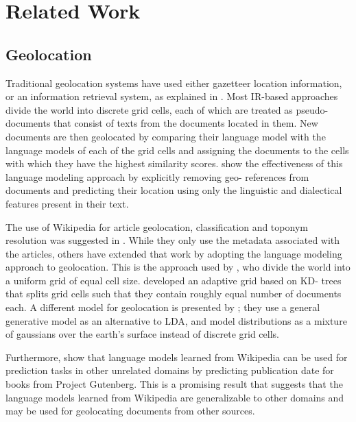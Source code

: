\section{Related Work} 

\subsection{Geolocation}   

Traditional geolocation systems have used either
gazetteer location information, or an information retrieval system, as
explained in \cite{skiles:12}. Most IR-based approaches divide the world into
discrete grid cells, each of which are treated as pseudo-documents that
consist of texts from the documents located in them. New documents are then
geolocated by comparing their language model with the language models of each
of the grid cells and assigning the documents to the cells with which they
have the highest similarity scores. \cite{eisenstein-smith-xing:11} show the
effectiveness of this language modeling approach by explicitly removing geo-
references from documents and predicting their location using only the
linguistic and dialectical features present in their text.

\par The use of Wikipedia for article geolocation, classification and toponym
resolution was suggested in \cite{overell2009geographic}. While they only use
the metadata associated with the articles, others have extended that work by
adopting the language modeling approach to geolocation.  This is the approach
used by \cite{wing-baldridge:11}, who divide the world into a uniform grid of
equal cell size. \cite{rolleretal:12} developed an adaptive grid based on KD-
trees that splits grid cells such that they contain roughly equal number of
documents each. A different model for geolocation is presented by
\cite{eisensteinetal:11}; they use a general generative model as an
alternative to LDA, and model distributions as a mixture of gaussians over the
earth's surface instead of discrete grid cells.

\par Furthermore, \cite{kumar-et-al:11} show that language models learned from
Wikipedia can be used for prediction tasks in other unrelated domains by
predicting publication date for books from Project Gutenberg. This is a
promising result that suggests that the language models learned from Wikipedia
are generalizable to other domains and may be used for geolocating documents
from other sources.

